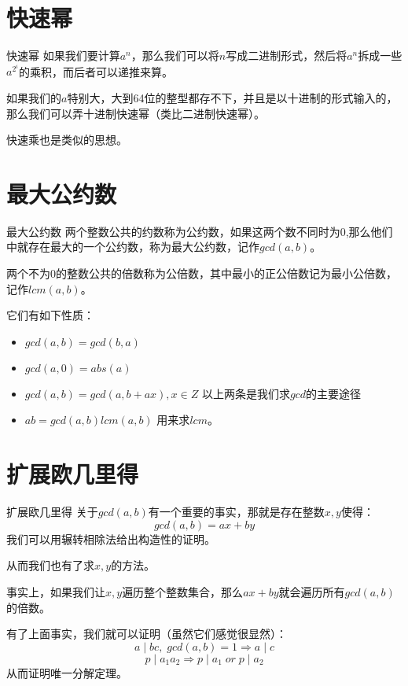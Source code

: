 \documentclass[9pt]{beamer}
\begin{document}
	\section{快速幂} 
		\begin{frame}{快速幂} 
			如果我们要计算$a^n$，那么我们可以将$n$写成二进制形式，然后将$a^n$拆成一些$a^{2^i}$的乘积，而后者可以递推来算。
			
			如果我们的$a$特别大，大到64位的整型都存不下，并且是以十进制的形式输入的，那么我们可以弄十进制快速幂（类比二进制快速幂）。
			
			快速乘也是类似的思想。
		\end{frame}
	\section{最大公约数} 
		\begin{frame}{最大公约数} 
			两个整数公共的约数称为公约数，如果这两个数不同时为$ 0 $,那么他们中就存在最大的一个公约数，称为最大公约数，记作$gcd(a,b)$。
			
			两个不为$0$的整数公共的倍数称为公倍数，其中最小的正公倍数记为最小公倍数，记作$lcm(a,b)$。
			
			它们有如下性质：
			
			\begin{itemize}
				\item $ gcd(a,b) = gcd(b,a) $
				\item $ gcd(a,0) = abs(a) $
				\item $ gcd(a,b) = gcd(a,b+ax), x \in Z $	以上两条是我们求$gcd$的主要途径
				\item $ ab = gcd(a,b)lcm(a,b) $  用来求$lcm$。
			\end{itemize}
		\end{frame} 
	\section{扩展欧几里得} 
		\begin{frame}{扩展欧几里得} 
			关于$gcd(a,b)$有一个重要的事实，那就是存在整数$x,y$使得：
			$$
			gcd(a,b) = ax+by
			$$
			我们可以用辗转相除法给出构造性的证明。

			从而我们也有了求$x,y$的方法。
			
			事实上，如果我们让$x,y$遍历整个整数集合，那么$ax+by$就会遍历所有$gcd(a,b)$的倍数。
			
			有了上面事实，我们就可以证明（虽然它们感觉很显然）：
			$$
				a \mid bc, \;  gcd(a,b) = 1 \Rightarrow a \mid c
			$$
			$$
				p \mid a_1a_2 \Rightarrow p \mid a_1 \; or \; p \mid a_2
			$$
			从而证明唯一分解定理。
		\end{frame}
\end{document}
